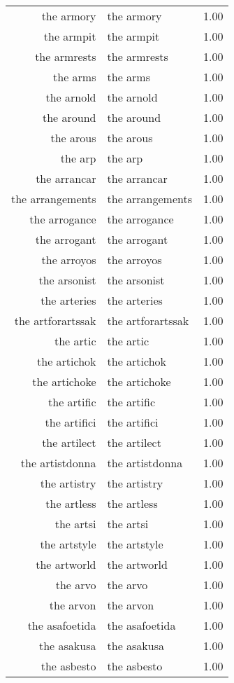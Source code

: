 \begin{table}[ht]
\begin{tabular}{rlr}
  the armory & the armory & 1.00 \\ 
  the armpit & the armpit & 1.00 \\ 
  the armrests & the armrests & 1.00 \\ 
  the arms & the arms & 1.00 \\ 
  the arnold & the arnold & 1.00 \\ 
  the around & the around & 1.00 \\ 
  the arous & the arous & 1.00 \\ 
  the arp & the arp & 1.00 \\ 
  the arrancar & the arrancar & 1.00 \\ 
  the arrangements & the arrangements & 1.00 \\ 
  the arrogance & the arrogance & 1.00 \\ 
  the arrogant & the arrogant & 1.00 \\ 
  the arroyos & the arroyos & 1.00 \\ 
  the arsonist & the arsonist & 1.00 \\ 
  the arteries & the arteries & 1.00 \\ 
  the artforartssak & the artforartssak & 1.00 \\ 
  the artic & the artic & 1.00 \\ 
  the artichok & the artichok & 1.00 \\ 
  the artichoke & the artichoke & 1.00 \\ 
  the artific & the artific & 1.00 \\ 
  the artifici & the artifici & 1.00 \\ 
  the artilect & the artilect & 1.00 \\ 
  the artistdonna & the artistdonna & 1.00 \\ 
  the artistry & the artistry & 1.00 \\ 
  the artless & the artless & 1.00 \\ 
  the artsi & the artsi & 1.00 \\ 
  the artstyle & the artstyle & 1.00 \\ 
  the artworld & the artworld & 1.00 \\ 
  the arvo & the arvo & 1.00 \\ 
  the arvon & the arvon & 1.00 \\ 
  the asafoetida & the asafoetida & 1.00 \\ 
  the asakusa & the asakusa & 1.00 \\ 
  the asbesto & the asbesto & 1.00 \\ 

\end{tabular}
\end{table}
